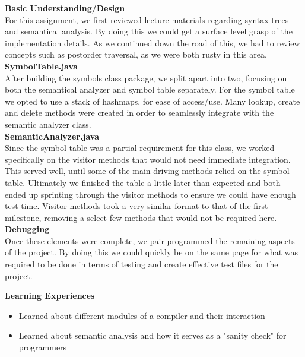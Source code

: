 \documentclass[12pt]{extarticle}
\begin{document}
\textbf{Basic Understanding/Design} \\
For this assignment, we first reviewed lecture materials regarding syntax trees and semantical analysis. By doing this we could get a surface level grasp of the implementation details. As we continued down the road of this, we had to review concepts such as postorder traversal, as we were both rusty in this area. \\
\textbf{SymbolTable.java} \\
After building the symbols class package, we split apart into two, focusing on both the semantical analyzer and symbol table separately. For the symbol table we opted to use a stack of hashmaps, for ease of access/use. Many lookup, create and delete methods were created in order to seamlessly integrate with the semantic analyzer class. \\
\textbf{SemanticAnalyzer.java} \\
Since the symbol table was a partial requirement for this class, we worked specifically on the visitor methods that would not need immediate integration. This served well, until some of the main driving methods relied on the symbol table. Ultimately we finished the table a little later than expected and both ended up sprinting through the visitor methods to ensure we could have enough test time. Visitor methods took a very similar format to that of the first milestone, removing a select few methods that would not be required here. \\
\textbf{Debugging} \\
Once these elements were complete, we pair programmed the remaining aspects of the project. By doing this we could quickly be on the same page for what was required to be done in terms of testing and create effective test files for the project.

\textbf{Learning Experiences}
\begin{itemize}
    \item Learned about different modules of a compiler and their interaction
    \item Learned about semantic analysis and how it serves as a "sanity check" for programmers
\end{itemize}
\end{document}
